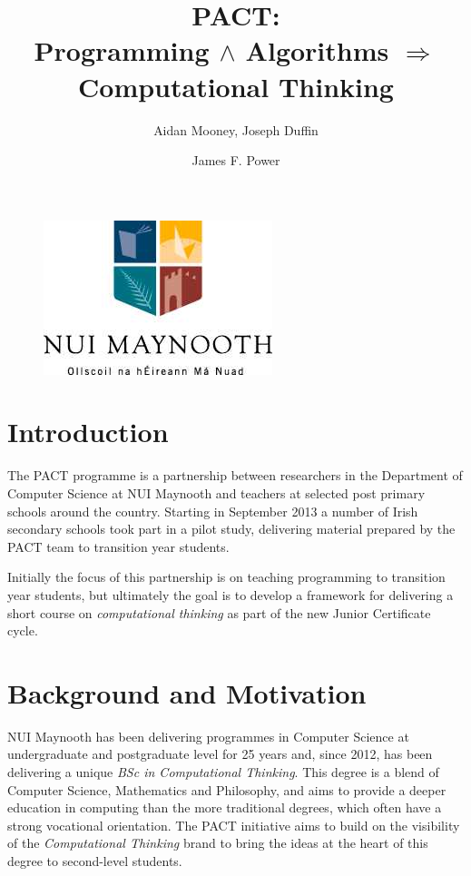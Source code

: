 \documentclass[a4paper]{article}
\begin{document}
\title{PACT: \\ {\large Programming ${\land}$ Algorithms $\Rightarrow$ Computational Thinking}}

\author{Aidan Mooney, Joseph Duffin \and James F. Power}

\begin{figure}\centering
\includegraphics[height=.2\textheight]{nuim_large.jpg}
\end{figure}

\maketitle

\section{Introduction}
The PACT programme is a partnership between researchers in the Department of Computer Science at NUI Maynooth and teachers at selected post primary schools around the country.   Starting in September 2013 a number of Irish secondary schools took part in a pilot study, delivering material prepared by the PACT team to transition year students.

Initially the focus of this partnership is on teaching programming to transition year students, but ultimately the goal is to develop a framework for delivering a short course on \textit{computational thinking} as part of the new Junior Certificate cycle.


\section{Background and Motivation}

NUI Maynooth has been delivering programmes in Computer Science at undergraduate and postgraduate level for 25 years and, since 2012, has been delivering a unique \textit{BSc in Computational Thinking}.  This degree is a blend of Computer Science, Mathematics and Philosophy, and aims to provide a deeper education in computing than the more traditional degrees, which often have a strong vocational orientation.  The PACT initiative aims to build on the visibility of the \textit{Computational Thinking} brand to bring the ideas at the heart of this degree to second-level students.
\end{document}
